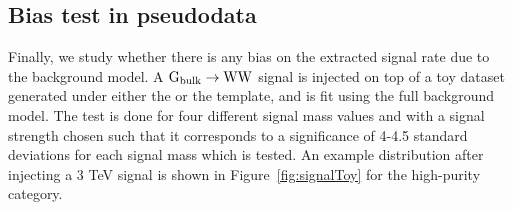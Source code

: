
\subsection{Bias test in pseudodata}
\label{sec:bias}
Finally, we study whether there is any bias on the extracted signal rate due to the background model. A $\mathrm{G}_\mathrm{bulk} \rightarrow\mathrm{W}\mathrm{W}$ signal is injected on top of a toy dataset generated under either the  or the \HERWIG{++} template, and is fit using the full background model. The test is done for four different signal mass values and with a signal strength chosen such that it corresponds to a significance of 4-4.5 standard deviations for each signal mass which is tested. An example distribution after injecting a 3 TeV signal is shown in Figure~\ref{fig:signalToy} for the high-purity category.
